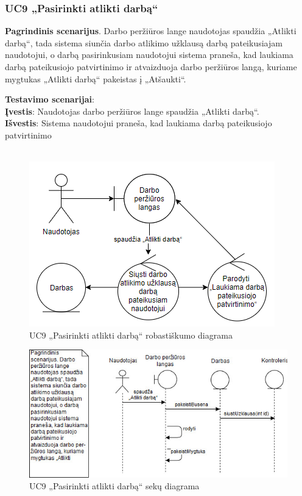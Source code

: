 \documentclass{VUMIFPSbakalaurinis}
\begin{document}
\subsubsection{UC9 „Pasirinkti atlikti darbą“}
\textbf{Pagrindinis scenarijus}. Darbo peržiūros lange naudotojas spaudžia „Atlikti darbą“, tada sistema siunčia darbo atlikimo užklausą darbą pateikusiajam naudotojui, o darbą pasirinkusiam naudotojui sistema praneša, kad laukiama darbą pateikusiojo patvirtinimo ir atvaizduoja darbo peržiūros langą, kuriame mygtukas „Atlikti darbą“ pakeistas į „Atšaukti“.
\par \textbf{Testavimo scenarijai}:\\
\textbf{Įvestis}: Naudotojas darbo peržiūros lange spaudžia „Atlikti darbą“. \\
\textbf{Išvestis}: Sistema naudotojui praneša, kad laukiama darbą pateikusiojo patvirtinimo \\ \\

\begin{figure}[H]
	\centering
	\includegraphics[scale=0.6]{img/Robustness/UC9}
	\caption{UC9 „Pasirinkti atlikti darbą“ robastiškumo diagrama}
	\label{img:uc9rob}
\end{figure}

\begin{figure}[H]
	\centering
	\includegraphics[scale=0.6]{img/Sequence/9sequence}
	\caption{UC9 „Pasirinkti atlikti darbą“ sekų diagrama}
	\label{img:uc9seq}
\end{figure}
\end{document}

